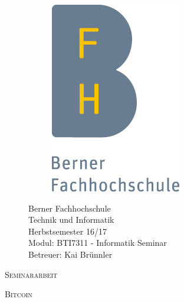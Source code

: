 \documentclass[a4paper, 11pt, DIV11, BCOR5mm]{scrartcl}
\newcommand{\thema}{Bitcoin}
\begin{document}
\thispagestyle{empty}

\begin{titlepage}
    \begin{figure}
        \begin{minipage}{0.3\textwidth}
            \begin{figure}[H]
                \includegraphics[scale=0.5]{BFH_Logo}
            \end{figure}
        \end{minipage}
        \hfill
        \begin{minipage}[t]{0.5\textwidth}
            \begin{flushright}
                Berner Fachhochschule\\
                Technik und Informatik\\
                \bigskip
                Herbstsemester 16/17\\
                \bigskip
                Modul: BTI7311 - Informatik Seminar\\
                Betreuer: Kai Brünnler\\
            \end{flushright}
        \end{minipage}
    \end{figure}
    \setlength{\textfloatsep}{4cm}
    {\centering
    {\scshape\large Seminararbeit \par}
    {\scshape\LARGE\thema\par}}
    \vfill
    \begin{figure}[!hb]

\end{figure}
\end{titlepage}
\end{document}
